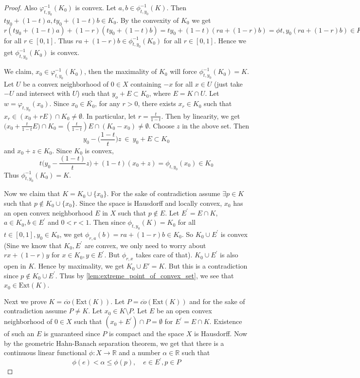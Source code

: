\begin{proof}
  Also $\varphi_{t, y_0}^{-1}(K_0)$ is convex. Let $a, b \in \phi^{-1}_{t, y_0}(K)$. Then $ty_0 + (1-t)a, ty_0 + (1-t)b \in K_0$. By the convexity of $K_0$ we get $r(ty_0 + (1-t)a) + (1-r)(ty_0 + (1-t)b) = ty_0 + (1-t)(ra + (1-r)b) = \phi{t, y_0}(ra + (1-r)b) \in K_0$ for all $r \in [0, 1]$. Thus $ra + (1-r)b \in \phi^{-1}_{t, y_0}(K_0)$ for all $r \in [0, 1]$. Hence we get $\phi^{-1}_{t, y_0}(K_0)$ is convex.

  We claim, $x_0 \in \varphi_{t, y_0}^{-1}(K_0)$, then the maximality of $K_0$ will force $\phi^{-1}_{t, y_0}(K_0) = K$.  Let $U$ be a
  convex neighborhood of $0 \in X$ containing $-x$ for all $x \in U$
\marginnote{\scriptsize \textcolor{red}{I can't picturize the choice of $z$}}
  (just take $-U$ and intersect with $U$) such that $y_o + E
  \subset K_0$, where $E = K \cap U$. Let $w = \varphi_{t, y_0}(x_0)$. Since $x_0 \in
  \overline{K_0}$, for any $r>0$, there exists $x_r \in K_0$ such that $x_r \in (x_0 +
  rE) \cap K_0 \neq \emptyset$. In particular, let $r = \frac{t}{1-t}$. Then by linearity, we get $\big(x_0 + \frac{t}{1-t}E\big) \cap K_0 = ( \frac{t}{1-t}  )E\cap
  (K_0 - x_0) \neq \emptyset$. Choose $z$ in the above set. Then \[
    y_0 - \Big( \frac{1-t}{t} \Big)z \ \in \ y_0 + E \subset K_0
  \]
  and $x_0 + z \in K_0$. Since $K_0$ is convex, \[
    t\Big(y_0 - \frac{(1-t)}{t}z\Big) + (1-t)(x_0 + z)  = \phi_{t,
    y_0}(x_0) \in K_0
  \]
  Thus $\phi^{-1}_{t, y_0}(K_0) = K$.

  Now we claim that $K = K_0 \cup \{ x_0 \}$. For the sake of
  contradiction assume $\exists p \in K$ such that $p \notin K_0 \cup
  \{ x_0 \}$. Since the space is Hausdorff and locally convex, $x_0$ has an
  open convex neighborhood $E$ in $X$ such that $p \not\in E$. Let
  $E^\prime = E \cap K$, $a \in K_0, b \in E^\prime$ and $0 < r < 1$.
  Then since $\phi_{t, y_0}(K) = K_0$ for all $t \in [0, 1], y_0 \in K_0$, we
  get $\phi_{r, a}(b) = ra + (1-r)b \in K_0$. So $K_0 \cup
  E^\prime$ is convex (Sine we know that $K_0, E^\prime$ are convex,
    we only need to worry about $rx + (1-r)y$ for $x \in K_0, y \in
  E^\prime$. But $\phi_{r, x}$ takes care of that). $K_0 \cup
  E^\prime$ is also open in $K$. Hence by maximality, we get $K_0
  \cup E' = K$. But this is a contradiction since $ p \not\in K_0
  \cup E^\prime$. Thus by \autoref{lem:extreme_point_of_convex_set}, we see
  that $x_0 \in \textrm{Ext}(K)$.

  Next we prove $K = \overline{co}(\textrm{Ext}(K))$. Let $P =
  \overline{co}(\textrm{Ext}(K))$ and for the sake of contradiction
  assume $P \neq K$. Let $ x_0 \in K \setminus P$. Let $E$ be an open
  convex neighborhood of $0 \in X$ such that $(x_0 + E^\prime) \cap P
  = \emptyset$ for $E^\prime = E \cap K$. Existence of such an $E$ is guaranteed 
  since $P$ is compact and the space $X$ is Hausdorff.
\marginnote{\scriptsize \textcolor{red}{Don't know how to proceed after}}
  Now by the geometric Hahn-Banach separation theorem, we get that there is a continuous linear functional
  $\phi: X \to \mathbb{R}$ and a number $\alpha \in \mathbb{R}$ such that \[
      \phi(e) < \alpha \le \phi(p), \quad e \in E^\prime, p \in P
  \]


\end{proof}
